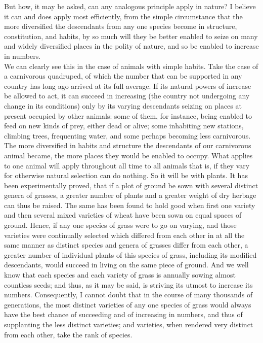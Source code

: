 \indent But how, it may be asked, can any analogous principle apply in nature? I believe it can and does apply most efficiently, from the simple circumstance that the more diversified the descendants from any one species become in structure, constitution, and habits, by so much will they be better enabled to seize on many and widely diversified places in the polity of nature, and so be enabled to increase in numbers. \\
\indent We can clearly see this in the case of animals with simple habits. Take the case of a carnivorous quadruped, of which the number that can be supported in any country has long ago arrived at its full average. If its natural powers of increase be allowed to act, it can succeed in increasing (the country not undergoing any change in its conditions) only by its varying descendants seizing on places at present occupied by other animals: some of them, for instance, being enabled to feed on new kinds of prey, either dead or alive; some inhabiting new stations, climbing trees, frequenting water, and some perhaps becoming less carnivorous. The more diversified in habits and structure the descendants of our carnivorous animal became, the more places they would be enabled to occupy. What applies to one animal will apply throughout all time to all animals that is, if they vary for otherwise natural selection can do nothing. So it will be with plants. It has been experimentally proved, that if a plot of ground be sown with several distinct genera of grasses, a greater number of plants and a greater weight of dry herbage can thus be raised. The same has been found to hold good when first one  variety and then several mixed varieties of wheat have been sown on equal spaces of ground. Hence, if any one species of grass were to go on varying, and those varieties were continually selected which differed from each other in at all the same manner as distinct species and genera of grasses differ from each other, a greater number of individual plants of this species of grass, including its modified descendants, would succeed in living on the same piece of ground. And we well know that each species and each variety of grass is annually sowing almost countless seeds; and thus, as it may be said, is striving its utmost to increase its numbers.  Consequently, I cannot doubt that in the course of many thousands of generations, the most distinct varieties of any one species of grass would always have the best chance of succeeding and of increasing in numbers, and thus of supplanting the less distinct varieties; and varieties, when rendered very distinct from each other, take the rank of species. \\
